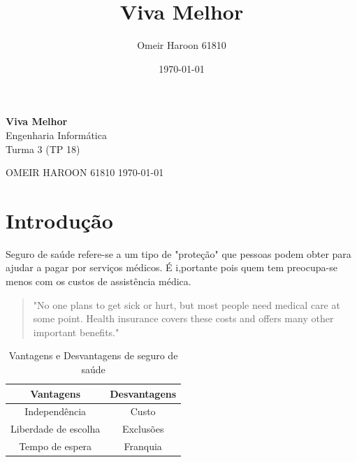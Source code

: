 \documentclass[10pt,a4paper]{article}
\title{Viva Melhor}
\author{Omeir Haroon 61810}
\date{\today}
\begin{document}
\begin{titlepage}
	\begin{center}
	{\Huge\bfseries Viva Melhor}\\
	\vspace{1cm}
	{\Large Engenharia Informática}\\
	\vspace{1cm}
	{\Large Turma 3 (TP 18)}\\
	\end{center}
	\begin{flushright}
	{\Large OMEIR HAROON \Large 61810 \hfill  \large\today}
	\end{flushright}
	\begin{figure}[h]
	\begin{center}
	\end{center}
	\end{figure}
\end{titlepage}



\section{Introdução}
	Seguro de saúde refere-se a um tipo de "proteção"
que pessoas podem obter para ajudar a pagar por serviços médicos. É i,portante pois quem tem preocupa-se menos com os custos de assistência médica.
\begin{quote}
    "No one plans to get sick or hurt, but most people need medical care at some point. Health insurance covers these costs and offers many other important benefits." \cite{healthcare}
\end{quote}

\begin{table}[h]
	\centering
	\caption{Vantagens e Desvantagens de seguro de saúde}
	\begin{tabular}{|c|c|} 
	\hline
	{\bfseries Vantagens} & {\bfseries Desvantagens}\\
	\hline
	Independência &  Custo\\
	\hline	
	Liberdade de escolha & Exclusões\\
	\hline	
	Tempo de espera  & Franquia\\
	\hline
	\end{tabular}
\end{table}
\newpage
\end{document}
